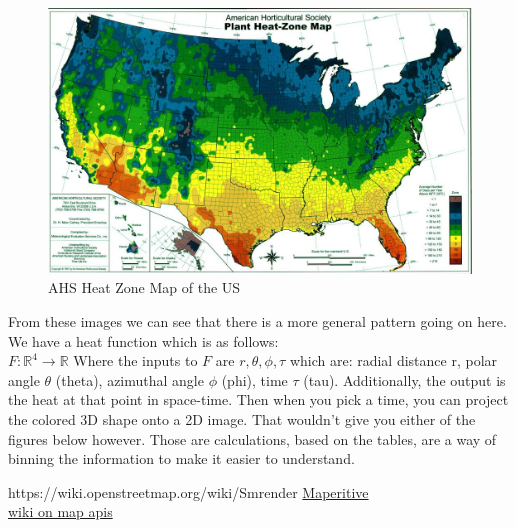 \documentclass[10pt]{extarticle}
\begin{document}
\begin{figure}
	\includegraphics[width=\linewidth]{Heat_Zone_Map_USA.jpg}
	\caption{AHS Heat Zone Map of the US}
	\label{fig:AHS Heat Zone Map}
\end{figure}

\newpage
From these images we can see that there is a more general pattern going on here. 
We have a heat function which is as follows: \\ 
$F : \mathbb{R}^4 \to \mathbb{R}$
Where the inputs to $F$ are $r,\theta,\phi,\tau$ which are: radial distance r, polar angle $\theta$ (theta), azimuthal angle $\phi$ (phi), time $\tau$ (tau). Additionally, the output is the heat at that point in space-time. 
Then when you pick a time, you can project the colored 3D shape onto a 2D image. That wouldn't give you either of the figures below however. Those are calculations, based on the tables, are a way of binning the information to make it easier to understand. 

https://wiki.openstreetmap.org/wiki/Smrender
\href{http://maperitive.net/docs/}{Maperitive} \\
\href{https://wiki.openstreetmap.org/wiki/Rendering}{wiki on map apis}
\end{document}
